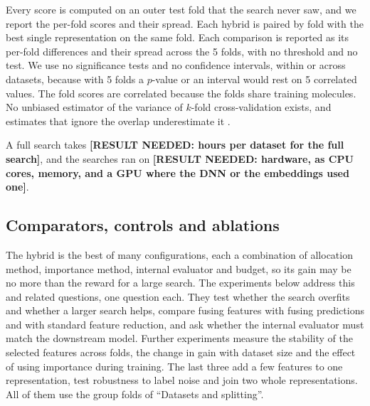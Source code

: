 Every score is computed on an outer test fold that the search never saw, and we report the per-fold scores and their spread. Each hybrid is paired by fold with the best single representation on the same fold. Each comparison is reported as its per-fold differences and their spread across the 5 folds, with no threshold and no test. We use no significance tests and no confidence intervals, within or across datasets, because with 5 folds a $p$-value or an interval would rest on 5 correlated values. The fold scores are correlated because the folds share training molecules. No unbiased estimator of the variance of $k$-fold cross-validation exists, and estimates that ignore the overlap underestimate it \citep{Bengio2004}.

A full search takes \textbf{[RESULT NEEDED: hours per dataset for the full search]}, and the searches ran on \textbf{[RESULT NEEDED: hardware, as CPU cores, memory, and a GPU where the DNN or the embeddings used one]}.


\subsection{Comparators, controls and ablations}

The hybrid is the best of many configurations, each a combination of allocation method, importance method, internal evaluator and budget, so its gain may be no more than the reward for a large search. The experiments below address this and related questions, one question each. They test whether the search overfits and whether a larger search helps, compare fusing features with fusing predictions and with standard feature reduction, and ask whether the internal evaluator must match the downstream model. Further experiments measure the stability of the selected features across folds, the change in gain with dataset size and the effect of using importance during training. The last three add a few features to one representation, test robustness to label noise and join two whole representations. All of them use the group folds of ``Datasets and splitting''.

